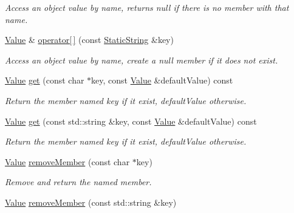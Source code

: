 \begin{DoxyCompactItemize}
\begin{DoxyCompactList}\small\item\em Access an object value by name, returns null if there is no member with that name. \end{DoxyCompactList}\item 
\hyperlink{class_json_1_1_value}{Value} \& \hyperlink{class_json_1_1_value_af36e4f699a27c83fed43d28d6f3b630b}{operator\mbox{[}$\,$\mbox{]}} (const \hyperlink{class_json_1_1_static_string}{Static\+String} \&key)
\begin{DoxyCompactList}\small\item\em Access an object value by name, create a null member if it does not exist. \end{DoxyCompactList}\item 
\hypertarget{class_json_1_1_value_a98a119e9fd96dfd5ef0463e40bbaeb52}{\hyperlink{class_json_1_1_value}{Value} \hyperlink{class_json_1_1_value_a98a119e9fd96dfd5ef0463e40bbaeb52}{get} (const char $\ast$key, const \hyperlink{class_json_1_1_value}{Value} \&default\+Value) const }\label{class_json_1_1_value_a98a119e9fd96dfd5ef0463e40bbaeb52}

\begin{DoxyCompactList}\small\item\em Return the member named key if it exist, default\+Value otherwise. \end{DoxyCompactList}\item 
\hypertarget{class_json_1_1_value_a3a97203002fc5f763917984224a44de7}{\hyperlink{class_json_1_1_value}{Value} \hyperlink{class_json_1_1_value_a3a97203002fc5f763917984224a44de7}{get} (const std\+::string \&key, const \hyperlink{class_json_1_1_value}{Value} \&default\+Value) const }\label{class_json_1_1_value_a3a97203002fc5f763917984224a44de7}

\begin{DoxyCompactList}\small\item\em Return the member named key if it exist, default\+Value otherwise. \end{DoxyCompactList}\item 
\hyperlink{class_json_1_1_value}{Value} \hyperlink{class_json_1_1_value_ae843da4b112b098fb66db5a07cefeb0f}{remove\+Member} (const char $\ast$key)
\begin{DoxyCompactList}\small\item\em Remove and return the named member. \end{DoxyCompactList}\item 
\hypertarget{class_json_1_1_value_a3c94357301ebd610ec7f4d9e0f80fcff}{\hyperlink{class_json_1_1_value}{Value} \hyperlink{class_json_1_1_value_a3c94357301ebd610ec7f4d9e0f80fcff}{remove\+Member} (const std\+::string \&key)}\label{class_json_1_1_value_a3c94357301ebd610ec7f4d9e0f80fcff}


\end{DoxyCompactItemize}
